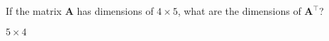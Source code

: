 If the matrix $\boldsymbol{A}$ has dimensions of $4 \times 5$, what are the dimensions of $\boldsymbol{A}^\intercal$?

\begin{solution}
$5 \times 4$
\end{solution}